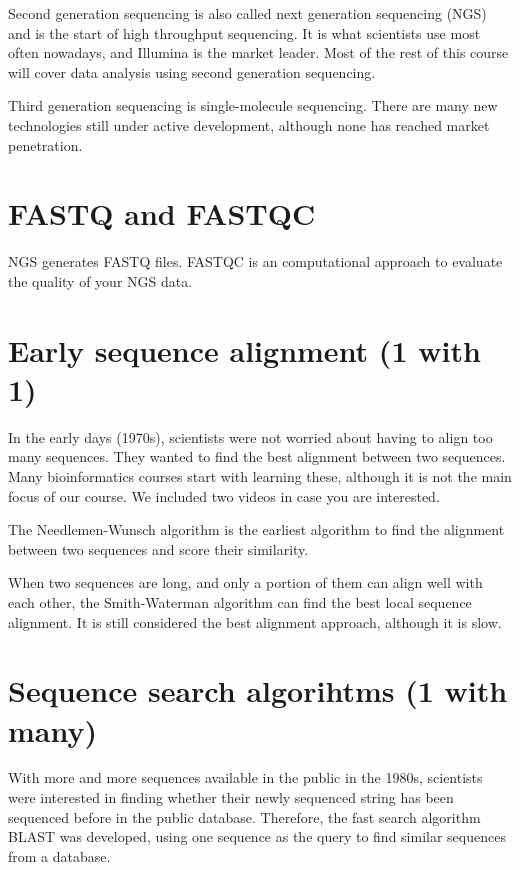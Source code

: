 \documentclass[]{book}
\begin{document}
Second generation sequencing is also called next generation sequencing (NGS) and is the start of high throughput sequencing. It is what scientists use most often nowadays, and Illumina is the market leader. Most of the rest of this course will cover data analysis using second generation sequencing.

Third generation sequencing is single-molecule sequencing. There are many new technologies still under active development, although none has reached market penetration.

\hypertarget{fastq-and-fastqc}{%
\section{FASTQ and FASTQC}\label{fastq-and-fastqc}}

NGS generates FASTQ files. FASTQC is an computational approach to evaluate the quality of your NGS data.

\hypertarget{early-sequence-alignment-1-with-1}{%
\section{Early sequence alignment (1 with 1)}\label{early-sequence-alignment-1-with-1}}

In the early days (1970s), scientists were not worried about having to align too many sequences. They wanted to find the best alignment between two sequences. Many bioinformatics courses start with learning these, although it is not the main focus of our course. We included two videos in case you are interested.

The Needlemen-Wunsch algorithm is the earliest algorithm to find the alignment between two sequences and score their similarity.

When two sequences are long, and only a portion of them can align well with each other, the Smith-Waterman algorithm can find the best local sequence alignment. It is still considered the best alignment approach, although it is slow.

\hypertarget{sequence-search-algorihtms-1-with-many}{%
\section{Sequence search algorihtms (1 with many)}\label{sequence-search-algorihtms-1-with-many}}

With more and more sequences available in the public in the 1980s, scientists were interested in finding whether their newly sequenced string has been sequenced before in the public database. Therefore, the fast search algorithm BLAST was developed, using one sequence as the query to find similar sequences from a database.
\end{document}

